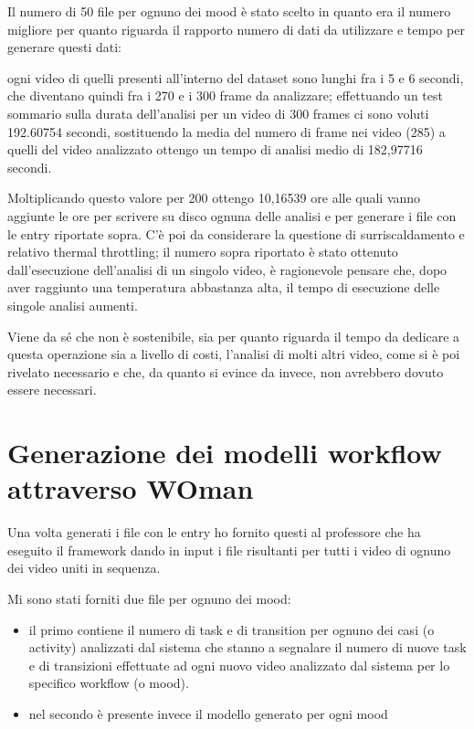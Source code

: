 Il numero di 50 file per ognuno dei mood è stato scelto in quanto era il numero migliore per quanto riguarda il rapporto numero di dati da utilizzare e tempo per generare questi dati:

ogni video di quelli presenti all’interno del dataset \cite{DAiSEE} sono lunghi fra i 5 e 6 secondi, che diventano quindi fra i 270 e i 300 frame da analizzare; effettuando un test sommario sulla durata dell’analisi per un video di 300 frames ci sono voluti 192.60754 secondi, sostituendo la media del numero di frame nei video (285) a quelli del video analizzato ottengo un tempo di analisi medio di 182,97716 secondi.

Moltiplicando questo valore per 200 ottengo 10,16539 ore alle quali vanno aggiunte le ore per scrivere su disco ognuna delle analisi e per generare i file con le entry riportate sopra. C’è poi da considerare la questione di surriscaldamento e relativo thermal throttling; il numero sopra riportato è stato ottenuto dall’esecuzione dell’analisi di un singolo video, è ragionevole pensare che, dopo aver raggiunto una temperatura abbastanza alta, il tempo di esecuzione delle singole analisi aumenti. 

Viene da sé che non è sostenibile, sia per quanto riguarda il tempo da dedicare a questa operazione sia a livello di costi, l’analisi di molti altri video, come si è poi rivelato necessario e che, da quanto si evince da \cite{WOman} invece, non avrebbero dovuto essere necessari. 

\section{Generazione dei modelli workflow attraverso WOman}
Una volta generati i file con le entry ho fornito questi al professore che ha eseguito il framework dando in input i file risultanti per tutti i video di ognuno dei video uniti in sequenza.

Mi sono stati forniti due file per ognuno dei mood:
\begin{itemize}
\item il primo contiene il numero di task e di transition per ognuno dei casi (o activity) analizzati dal sistema che stanno a segnalare il numero di nuove task e di transizioni effettuate ad ogni nuovo video analizzato dal sistema per lo specifico workflow (o mood).
\item nel secondo è presente invece il modello generato per ogni mood
\end{itemize}


